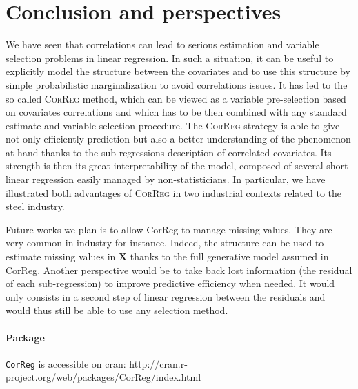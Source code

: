 \documentclass[11pt,a4paper]{article}
\begin{document}
\section{Conclusion and perspectives} \label{conclusion}
	We have seen that correlations can lead to serious estimation and variable selection problems in linear regression. In such a situation, it can be useful to explicitly model the structure between the covariates and to use this structure by simple probabilistic marginalization to avoid correlations issues. It has led to the so called \textsc{CorReg} method, which can be viewed as a variable pre-selection based on covariates correlations and which has to be then combined with any standard estimate and variable selection procedure. The \textsc{CorReg} strategy is able to give not only efficiently prediction but also a better understanding of the phenomenon at hand thanks to the sub-regressions description of correlated covariates. Its strength is then its great interpretability of the model, composed of several short linear regression easily managed by non-statisticians. In particular, we have illustrated both advantages of \textsc{CorReg} in two industrial contexts related to the steel industry.
	

Future works we plan is to allow {\sc CorReg} to manage missing values. They are very common in industry for instance. Indeed, the structure can be used to estimate missing values in $\boldsymbol{X}$ thanks to the full generative model assumed in {\sc CorReg}. Another perspective would be to take back lost information (the residual of each sub-regression) to improve predictive efficiency when needed. It would only consists in a second step of linear regression between the residuals and would thus still be able to use any selection method.

\paragraph{Package} {\tt CorReg} is accessible on {\sc cran}: http://cran.r-project.org/web/packages/CorReg/index.html
\end{document}
